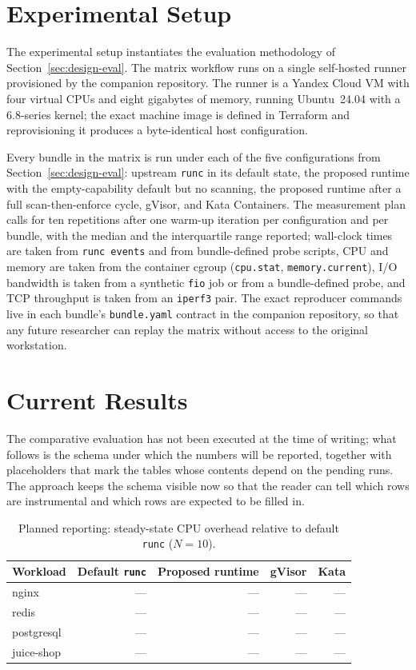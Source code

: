 \section{Experimental Setup}\label{sec:impl-setup}

The experimental setup instantiates the evaluation methodology of Section~\ref{sec:design-eval}. The matrix workflow runs on a single self-hosted runner provisioned by the companion repository. The runner is a Yandex Cloud VM with four virtual CPUs and eight gigabytes of memory, running Ubuntu~24.04 with a 6.8-series kernel; the exact machine image is defined in Terraform and reprovisioning it produces a byte-identical host configuration.

Every bundle in the matrix is run under each of the five configurations from Section~\ref{sec:design-eval}: upstream \texttt{runc} in its default state, the proposed runtime with the empty-capability default but no scanning, the proposed runtime after a full scan-then-enforce cycle, gVisor, and Kata Containers. The measurement plan calls for ten repetitions after one warm-up iteration per configuration and per bundle, with the median and the interquartile range reported; wall-clock times are taken from \texttt{runc events} and from bundle-defined probe scripts, CPU and memory are taken from the container cgroup (\texttt{cpu.stat}, \texttt{memory.current}), I/O bandwidth is taken from a synthetic \texttt{fio} job or from a bundle-defined probe, and TCP throughput is taken from an \texttt{iperf3} pair. The exact reproducer commands live in each bundle's \texttt{bundle.yaml} contract in the companion repository, so that any future researcher can replay the matrix without access to the original workstation.

\section{Current Results}\label{sec:impl-results}

The comparative evaluation has not been executed at the time of writing; what follows is the schema under which the numbers will be reported, together with placeholders that mark the tables whose contents depend on the pending runs. The approach keeps the schema visible now so that the reader can tell which rows are instrumental and which rows are expected to be filled in.

\begin{table}[ht]
\centering
\caption{Planned reporting: steady-state CPU overhead relative to default \texttt{runc} ($N=10$).}
\label{tab:cpu}
\begin{tabular}{lrrrr}
\toprule
\textbf{Workload} & \textbf{Default \texttt{runc}} & \textbf{Proposed runtime} & \textbf{gVisor} & \textbf{Kata} \\
\midrule
nginx       & ---  & --- & --- & --- \\
redis       & ---  & --- & --- & --- \\
postgresql  & ---  & --- & --- & --- \\
juice-shop  & ---  & --- & --- & --- \\
\bottomrule
\end{tabular}
\end{table}

